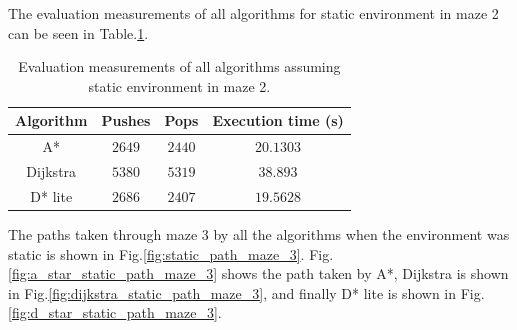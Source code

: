 The evaluation measurements of all algorithms for static environment in maze 2 can be seen in Table.\:\ref{tab:metric_static_maze_2}.

\begin{table}
    \centering
    \begin{tabular}{c|c|c|c}
        Algorithm   & Pushes    & Pops      & Execution time (s)    \\ \hline
        A*          & $2649$    & $2440$    & $20.1303$             \\
        Dijkstra    & $5380$    & $5319$    & $38.893$              \\
        D* lite     & $2686$    & $2407$    & $19.5628$
    \end{tabular}
    \caption{Evaluation measurements of all algorithms assuming static environment in maze 2.}
    \label{tab:metric_static_maze_2}
\end{table}


The paths taken through maze 3 by all the algorithms when the environment was static is shown in Fig.\:\ref{fig:static_path_maze_3}. Fig.\:\ref{fig:a_star_static_path_maze_3} shows the path taken by A*, Dijkstra is shown in Fig.\:\ref{fig:dijkstra_static_path_maze_3}, and finally D* lite is shown in Fig.\:\ref{fig:d_star_static_path_maze_3}.

